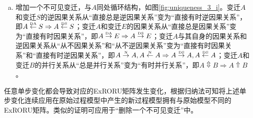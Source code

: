 \begin{enumerate}[(a)]
  \item 增加一个不可见变迁，与$A$同处循环结构，如图\ref{fig:uniqueness_3_i}。变迁$A$和变迁$S$的逆因果关系从“直接总是逆因果关系”变为“直接有时逆因果关系”，即$A\overset{\text{\tiny{DA}}}{\leftarrow}S\Rightarrow A\overset{\text{\tiny{DS}}}{\leftarrow}S$；变迁$A$和变迁$E$的因果关系从“直接总是因果关系”变为“直接有时因果关系”，即$A\overset{\text{\tiny{DA}}}{\rightarrow}E\Rightarrow A\overset{\text{\tiny{DS}}}{\rightarrow}E$；变迁$A$与其自身的因果关系和逆因果关系从“从不因果关系”和“从不逆因果关系”变为“直接有时因果关系”和“直接有时逆因果关系”，即$A\overset{\text{\tiny{N}}}{\rightarrow}A,A\overset{\text{\tiny{N}}}{\leftarrow}A\Rightarrow A\overset{\text{\tiny{DS}}}{\rightarrow}A,A\overset{\text{\tiny{DS}}}{\leftarrow}A$；变迁$A$和变迁$B$的并行关系从“总是并行关系”变为“有时并行关系”，即$A\Updownarrow B\Rightarrow A\Uparrow B$。
\end{enumerate}
任意单步变化都会导致对应的ExRORU矩阵发生变化，根据归纳法可知将上述单步变化连续应用在原始过程模型中产生的新过程模型拥有与原始模型不同的ExRORU矩阵。类似的证明可应用于“删除一个不可见变迁”中。

